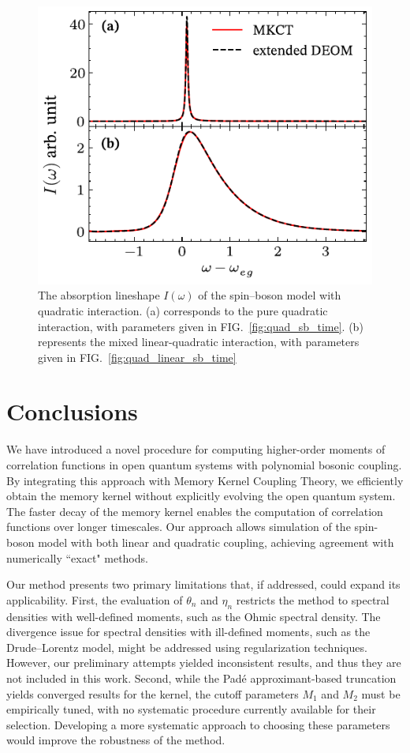 \documentclass[preprint,aip,jcp]{revtex4-2}
\begin{document}
\begin{figure}[htbp]
    \centering
    \includegraphics[width=0.49\linewidth]{figs/quad_freq_lb.pdf}
    \caption{The absorption lineshape $I(\omega)$ of the spin–boson model with quadratic interaction. (a) corresponds to the pure quadratic interaction, with parameters given in FIG.~\ref{fig:quad_sb_time}. (b) represents the mixed linear-quadratic interaction, with parameters given in FIG.~\ref{fig:quad_linear_sb_time}}
    \label{fig:quad_sb_freq}
\end{figure}


\section{Conclusions\label{sec:conclusion}}
We have introduced a novel procedure for computing higher-order moments of correlation functions in open quantum systems with polynomial bosonic coupling. By integrating this approach with Memory Kernel Coupling Theory, we efficiently obtain the memory kernel without explicitly evolving the open quantum system. The faster decay of the memory kernel enables the computation of correlation functions over longer timescales. Our approach allows simulation of the spin-boson model with both linear and quadratic coupling, achieving agreement with numerically ``exact" methods.

Our method presents two primary limitations that, if addressed, could expand its applicability. First, the evaluation of $\theta_n$ and $\eta_n$ restricts the method to spectral densities with well-defined moments, such as the Ohmic spectral density. The divergence issue for spectral densities with ill-defined moments, such as the Drude–Lorentz model, might be addressed using regularization techniques. However, our preliminary attempts yielded inconsistent results, and thus they are not included in this work. Second, while the Pad\'{e} approximant-based truncation yields converged results for the kernel, the cutoff parameters $M_1$ and $M_2$ must be empirically tuned, with no systematic procedure currently available for their selection. Developing a more systematic approach to choosing these parameters would improve the robustness of the method.
\end{document}

